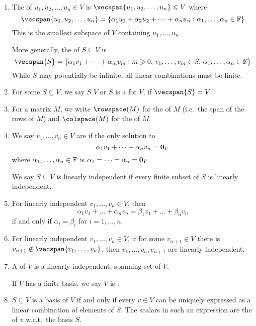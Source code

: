 \documentclass{styles/note}
\begin{document}
  \begin{enumerate}[label=(\alph*)]
    \item The  of $u_1, u_2, \dots, u_n \in V$ is $\vecspan{u_1, u_2, \dots, u_n} \leqslant V$ where
      \[ \vecspan{u_1, u_2, \dots, u_n} = \set{\alpha_1 u_1 + \alpha_2 u_2 + \dots + \alpha_n u_n : \alpha_1, \dots, \alpha_n \in \FF} \]
      This is the smallest subspace of $V$ containing $u_1, \dots, u_n$.
      
      More generally, the  of $S \subseteq V$ is
      \[ \vecspan{S} = \set{\alpha_1 v_1 + \dots + \alpha_m v_m : m \geqslant 0,\, v_1, \dots, v_m \in S,\, \alpha_1, \dots, \alpha_n \in \FF} \]
      While $S$ may potentially be infinite, all linear combinations must be finite.
    
    \item For some $S \subseteq V$, we say $S$  $V$ or $S$ is a  for $V$, if $\vecspan{S} = V$.
    
    \item For a matrix $M$, we write $\rowspace(M)$ for the  of $M$ (i.e.~the span of the rows of $M$) and $\colspace(M)$ for the  of $M$.
    
    \item We say $v_1, \dots, v_n \in V$ are  if the only solution to
      \[ \alpha_1 v_1 + \dots + \alpha_n v_n = \vb{0}_V \]
      where $\alpha_1, \dots, \alpha_n \in \mathbb{F}$ is $\alpha_1 = \dots = \alpha_n = \vb{0}_V$.
      
      We say $S \subseteq V$ is linearly independent if every finite subset of $S$ is linearly independent.
    
    \item For linearly independent $v_1, \dots, v_n \in V$, then
      \[ \alpha_1 v_1 + \dots + \alpha_n v_n = \beta_1 v_1 + \dots + \beta_n v_n \]
      if and only if $\alpha_i = \beta_i$ for $i = 1, \dots, n$.
    
    \item For linearly independent $v_1, \dots, v_n \in V$, if for some $v_{n+1} \in V$ there is $v_{n+1} \notin \vecspan{v_1, \dots, v_n}$, then $v_1, \dots, v_n, v_{n+1}$ are linearly independent.
    
    \item A  of $V$ is a linearly independent, spanning set of $V$.
    
      If $V$ has a finite basis, we say $V$ is .
    
    \item $S \subseteq V$ is a basis of $V$ if and only if every $v \in V$ can be uniquely expressed as a linear combination of elements of $S$. The scalars in such an expression are the  of $v$ w.r.t.~the basis $S$.
  \end{enumerate}
\end{document}
